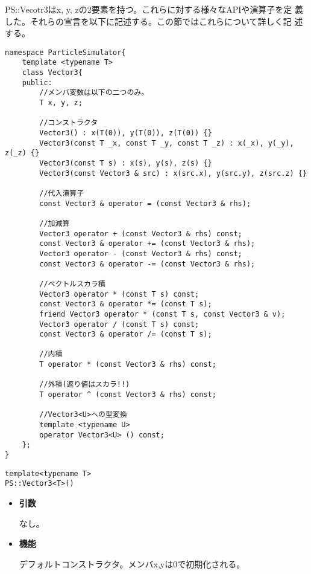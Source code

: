 PS::Vecotr3はx, y, zの2要素を持つ。これらに対する様々なAPIや演算子を定
義した。それらの宣言を以下に記述する。この節ではこれらについて詳しく記
述する。
\begin{lstlisting}[caption=Vector3]
namespace ParticleSimulator{
    template <typename T>
    class Vector3{
    public:
        //メンバ変数は以下の二つのみ。
        T x, y, z;

        //コンストラクタ
        Vector3() : x(T(0)), y(T(0)), z(T(0)) {}
        Vector3(const T _x, const T _y, const T _z) : x(_x), y(_y), z(_z) {}
        Vector3(const T s) : x(s), y(s), z(s) {}
        Vector3(const Vector3 & src) : x(src.x), y(src.y), z(src.z) {}

        //代入演算子
        const Vector3 & operator = (const Vector3 & rhs);

        //加減算
        Vector3 operator + (const Vector3 & rhs) const;
        const Vector3 & operator += (const Vector3 & rhs);
        Vector3 operator - (const Vector3 & rhs) const;
        const Vector3 & operator -= (const Vector3 & rhs);

        //ベクトルスカラ積
        Vector3 operator * (const T s) const;
        const Vector3 & operator *= (const T s);
        friend Vector3 operator * (const T s, const Vector3 & v);
        Vector3 operator / (const T s) const;
        const Vector3 & operator /= (const T s);

        //内積
        T operator * (const Vector3 & rhs) const;

        //外積(返り値はスカラ!!)
        T operator ^ (const Vector3 & rhs) const;

        //Vector3<U>への型変換
        template <typename U>
        operator Vector3<U> () const;
    };
}
\end{lstlisting}
\mbox{}
\begin{screen}
\begin{verbatim}
template<typename T>
PS::Vector3<T>()
\end{verbatim}
\end{screen}

\begin{itemize}

\item{{\bf 引数}}

なし。

\item{{\bf 機能}}

デフォルトコンストラクタ。メンバx,yは0で初期化される。

\end{itemize}

